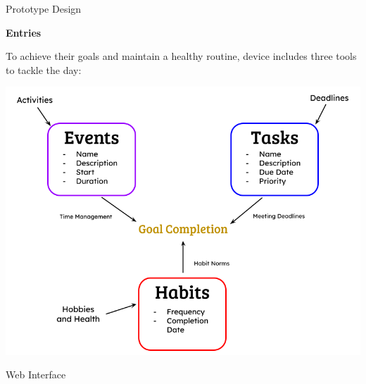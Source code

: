 \documentclass[final]{beamer}
\newlength{\colwidth}
\begin{document}
\begin{frame}[t]
\begin{columns}[t]
\begin{column}{\colwidth}
      \begin{block}{Prototype Design}

        \textbf{Entries}

        To achieve their goals and maintain a healthy routine, device includes 
        three tools to tackle the day:

        \begin{center}
          \includegraphics[width = 0.9 \textwidth]{entry_logic.png}
        \end{center}

      \end{block}

      \begin{block}{Web Interface}


\end{block}
\end{column}
\end{columns}
\end{frame}
\end{document}
